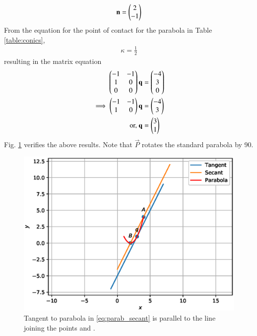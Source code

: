 \begin{enumerate}[label=\thesubsection.\arabic*.,ref=\thesubsection.\theenumi]
\begin{align}
\mathbf{n} =  \begin{pmatrix}2\\-1\end{pmatrix}
\label{eq:parab_secant_twovar_n}
\end{align}
From the equation for the point of contact for the  parabola  in Table \ref{table:conics},
\begin{align}
\kappa = \frac{1}{2}
\end{align}
resulting in the matrix equation
\begin{align}
\begin{pmatrix}-1 & -1\\1 & 0\\0&0\end{pmatrix}\mathbf{q} &= \begin{pmatrix}-4\\3\\0\end{pmatrix}
\\
\implies \begin{pmatrix}-1 & -1\\1 & 0\end{pmatrix}\mathbf{q} &= \begin{pmatrix}-4\\3\end{pmatrix}
\\
\text{or, } \mathbf{q} &= \begin{pmatrix}3\\1\end{pmatrix}
\end{align}
Fig. \ref{fig:parab_secant_tangent}	verifies the above results.  Note that $\vec{P}$ rotates the standard parabola by 90\degree.
%
\begin{figure}[!ht]
\centering
\includegraphics[width=\columnwidth]{./figs/parab/parab_tangent_secant.eps}
\caption{Tangent to  parabola in \eqref{eq:parab_secant}  is parallel to the line joining the points  and . }
\label{fig:parab_secant_tangent}	
\end{figure}

\end{enumerate}
